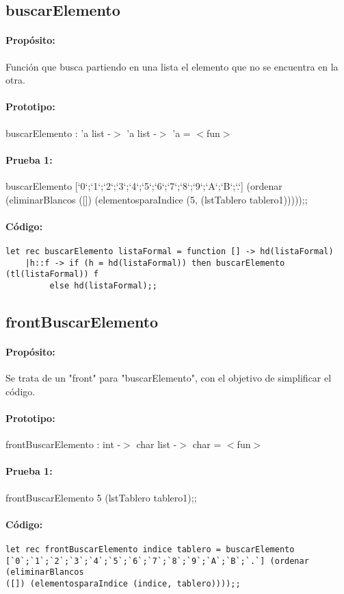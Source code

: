 \subsection{buscarElemento}

\paragraph{Propósito:} Función que busca partiendo en una lista el elemento que no se
encuentra en la otra.
\paragraph{Prototipo:} buscarElemento : 'a list -$>$ 'a list -$>$ 'a = $<$fun$>$
\paragraph{Prueba 1:} buscarElemento [`0`;`1`;`2`;`3`;`4`;`5`;`6`;`7`;`8`;`9`;`A`;`B`;`.`]
(ordenar (eliminarBlancos ([]) (elementosparaIndice (5, (lstTablero
tablero1)))));;
\paragraph{Código:}
\begin{verbatim}
let rec buscarElemento listaFormal = function [] -> hd(listaFormal)
	|h::f -> if (h = hd(listaFormal)) then buscarElemento (tl(listaFormal)) f 
		 else hd(listaFormal);;
\end{verbatim}

\subsection{frontBuscarElemento}

\paragraph{Propósito:} Se trata de un "front" para "buscarElemento", con el objetivo de
simplificar el código.
\paragraph{Prototipo:} frontBuscarElemento : int -$>$ char list -$>$ char = $<$fun$>$ 
\paragraph{Prueba 1:} frontBuscarElemento 5 (lstTablero tablero1);;
\paragraph{Código:}
\begin{verbatim}
let rec frontBuscarElemento indice tablero = buscarElemento
[`0`;`1`;`2`;`3`;`4`;`5`;`6`;`7`;`8`;`9`;`A`;`B`;`.`] (ordenar (eliminarBlancos
([]) (elementosparaIndice (indice, tablero))));;
\end{verbatim}

